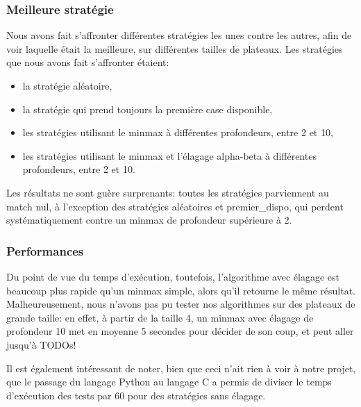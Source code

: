 \subsubsection{Meilleure stratégie}
Nous avons fait s'affronter différentes stratégies les unes contre les
autres, afin de voir laquelle était la meilleure, sur différentes
tailles de plateaux. Les stratégies que nous avons fait s'affronter
étaient:
\begin{itemize}
  \item la stratégie aléatoire,
  \item la stratégie qui prend toujours la première case disponible,
  \item les stratégies utilisant le minmax à différentes profondeurs,
    entre 2 et 10,
  \item les stratégies utilisant le minmax et l'élagage alpha-beta à
    différentes profondeurs, entre 2 et 10.
\end{itemize}
Les résultats ne sont guère surprenants: toutes les stratégies
parviennent au match nul, à l'exception des stratégies aléatoires et
premier\_dispo, qui perdent systématiquement contre un minmax de
profondeur supérieure à 2.

\subsubsection{Performances}
Du point de vue du temps d'exécution, toutefois, l'algorithme avec
élagage est beaucoup plus rapide qu'un minmax simple, alors qu'il
retourne le même résultat.
Malheureusement, nous n'avons pas pu tester nos algorithmes sur des
plateaux de grande taille: en effet, à partir de la taille 4, un
minmax avec élagage de profondeur 10 met en moyenne 5 secondes pour
décider de son coup, et peut aller jusqu'à TODOs!

Il est également intéressant de noter, bien que ceci n'ait rien à voir
à notre projet, que le passage du langage Python au langage C a permis
de diviser le temps d'exécution des tests par 60 pour des stratégies
sans élagage.
